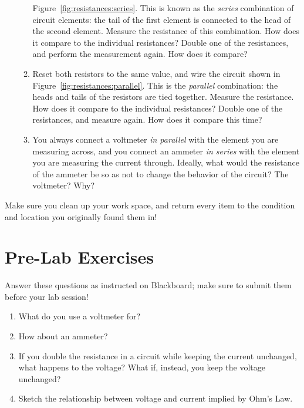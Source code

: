 \documentclass[12pt]{article}
\begin{document}
\begin{enumerate}
\begin{enumerate}
    Figure~\ref{fig:resistances:series}.  This is known as the
    \textit{series} combination of circuit elements: the tail of the
    first element is connected to the head of the second element.
    Measure the resistance of this combination.  How does it compare
    to the individual resistances?  Double one of the resistances, and
    perform the measurement again.  How does it compare?
  \item \label{item:parallel} Reset both resistors to the same value,
    and wire the circuit shown in
    Figure~\ref{fig:resistances:parallel}.  This is the
    \textit{parallel} combination: the heads and tails of the
    resistors are tied together.  Measure the resistance.  How does it
    compare to the individual resistances?  Double one of the
    resistances, and measure again.  How does it compare this time?
  \item You always connect a voltmeter \textit{in parallel} with the
    element you are measuring across, and you connect an ammeter
    \textit{in series} with the element you are measuring the current
    through.  Ideally, what would the resistance of the ammeter be so
    as not to change the behavior of the circuit?  The voltmeter?
    Why? 
  \end{enumerate}
\end{enumerate}

Make sure you clean up your work space, and return every item to the
condition and location you originally found them in!

\newpage

\section*{Pre-Lab Exercises}

Answer these questions as instructed on Blackboard; make sure to
submit them before your lab session!

\begin{enumerate}
\item What do you use a voltmeter for?
\item How about an ammeter?
\item If you double the resistance in a circuit while keeping the
  current unchanged, what happens to the voltage?  What if, instead,
  you keep the voltage unchanged?
\item Sketch the relationship between voltage and current implied by
  Ohm's Law.
\end{enumerate}
\end{document}
